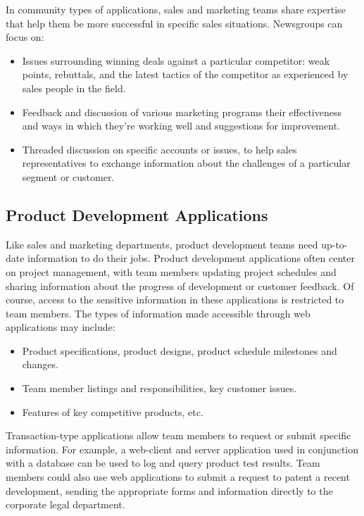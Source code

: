 In community types of applications, sales and marketing teams share
expertise that help them be more successful in specific sales
situations. Newsgroups can focus on:
\begin{itemize}
  \item Issues surrounding winning deals against a particular competitor:
weak points, rebuttals, and the latest tactics of the competitor as
experienced by sales people in the field.
  \item Feedback and discussion of various marketing programs their
effectiveness and ways in which they're working well and suggestions
for improvement.
  \item Threaded discussion on specific accounts or issues, to help sales
representatives to exchange information about the challenges of a
particular segment or customer.
\end{itemize}

\subsection{Product Development Applications}

Like sales and marketing departments, product development teams need
up-to-date information to do their jobs. Product development
applications often center on project management, with team members
updating project schedules and sharing information about the progress
of development or customer feedback. Of course, access to the sensitive
information in these applications is restricted to team members. The
types of information made accessible through web applications may
include:
\begin{itemize}
  \item Product specifications, product designs, product schedule
milestones and changes.
  \item Team member listings and responsibilities, key customer issues.
  \item Features of key competitive products, etc.
\end{itemize}

Transaction-type applications allow team members to request or submit
specific information. For example, a web-client and server application
used in conjunction with a database can be used to log and query
product test results. Team members could also use web applications to
submit a request to patent a recent development, sending the
appropriate forms and information directly to the corporate legal
department.\\

